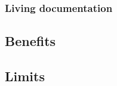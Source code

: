 \subsubsection{Living documentation}

\subsection{Benefits}\label{subsec:benefits}

\subsection{Limits}\label{subsec:limits}
